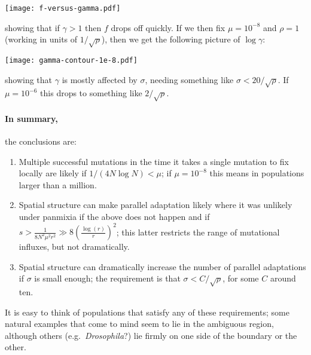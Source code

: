 \documentclass{article}
\begin{document}
\texttt{[image: f-versus-gamma.pdf]}

showing that if $\gamma>1$ then $f$ drops off quickly.
If we then fix $\mu=10^{-8}$ and $\rho=1$ (working in units of $1/\sqrt{\rho}$), 
then we get the following picture of $\log \gamma$:

\texttt{[image: gamma-contour-1e-8.pdf]}

showing that $\gamma$ is mostly affected by $\sigma$,
needing something like $\sigma<20/\sqrt{\rho}$.
If $\mu=10^{-6}$ this drops to something like $2/\sqrt{\rho}$.

\paragraph{In summary,}
the conclusions are:
\begin{enumerate}

  \item Multiple successful mutations in the time it takes a single mutation to fix locally
    are likely if $1/(4 N \log N) < \mu$; if $\mu=10^{-8}$ this means in populations larger than a million.

  \item Spatial structure can make parallel adaptation likely where it was unlikely under panmixia
    if the above does not happen and if
    $s > \frac{1}{8 N^2 \mu^2 r^2} \gg 8 \left(\frac{ \log(r) }{ r }\right)^2$;
    this latter restricts the range of mutational influxes, but not dramatically.

  \item Spatial structure can dramatically increase the number of parallel adaptations if $\sigma$ is small enough;
    the requirement is that $\sigma<C/\sqrt{\rho}$, for some $C$ around ten.

\end{enumerate}

It is easy to think of populations that satisfy any of these requirements;
some natural examples that come to mind seem to lie in the ambiguous region,
although others (e.g.\ {\it Drosophila}?) lie firmly on one side of the boundary or the other.
\end{document}
